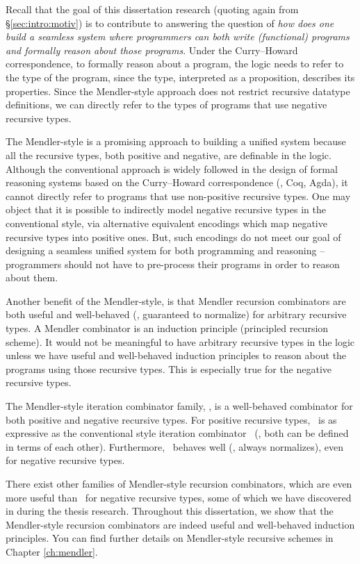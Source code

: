 Recall that the goal of this dissertation research
(quoting again from \S\ref{sec:intro:motiv})
is to contribute to answering the question of {\em how does one build a
seamless system where programmers can both write (functional) programs and
formally reason about those programs}. Under the Curry--Howard correspondence,
to formally reason about a program, the logic needs to refer to the type of
the program, since the type, interpreted as a proposition, describes its
properties. Since the Mendler-style approach does not restrict recursive
datatype definitions, we can directly refer to the types of programs that use
negative recursive types.

The Mendler-style is a promising approach to building a unified system because
all the recursive types, both positive and negative, are definable in the
logic. Although the conventional approach is widely followed in the design of
formal reasoning systems based on the Curry--Howard correspondence (\eg, Coq,
Agda), it cannot directly refer to programs that use non-positive recursive
types. One may object that it is possible to indirectly model negative
recursive types in the conventional style, via alternative equivalent
encodings which map negative recursive types into positive ones. But, such
encodings do not meet our goal of designing a seamless unified system for both
programming and reasoning -- programmers should not have to pre-process their
programs in order to reason about them.

Another benefit of the Mendler-style, is that Mendler recursion combinators
are both useful and well-behaved (\ie, guaranteed to normalize) for arbitrary
recursive types. A Mendler combinator is an induction principle
(principled recursion scheme). It would not be meaningful to have
arbitrary recursive types in the logic unless we have useful and well-behaved
induction principles to reason about the programs using those recursive types.
This is especially true for the negative recursive types.

The Mendler-style iteration combinator family, \MIt, is a well-behaved
combinator for both positive and negative recursive types.
For positive recursive types, \MIt\ is as expressive as the conventional style
iteration combinator \It\ (\ie, both can be defined in terms of each other). 
Furthermore, \MIt\ behaves well (\ie, always normalizes), even for negative
recursive types.

There exist other families of Mendler-style recursion combinators,
which are even more useful than \MIt\ for negative recursive types,
some of which we have discovered in during the thesis research. Throughout
this dissertation, we show that the Mendler-style recursion combinators are
indeed useful and well-behaved induction principles. You can find
further details on Mendler-style recursive schemes in Chapter \ref{ch:mendler}.

